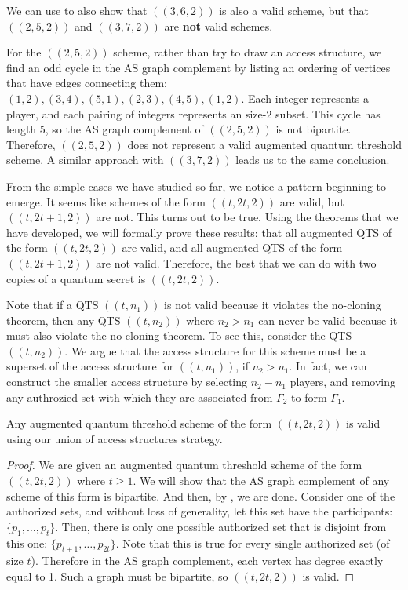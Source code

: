 We can use  to also show that $((3,6,2))$ is also a valid scheme, but that $((2,5,2))$ and $((3,7,2))$ are \textbf{not} valid schemes.

For the $((2,5,2))$ scheme, rather than try to draw an access structure, we find an odd cycle in the AS graph complement by listing an ordering of vertices that have edges connecting them: $(1,2), (3,4), (5,1), (2,3), (4,5), (1,2)$. Each integer represents a player, and each pairing of integers represents an size-2 subset. This cycle has length 5, so the AS graph complement of $((2,5,2))$ is not bipartite. Therefore, $((2,5,2))$ does not represent a valid augmented quantum threshold scheme. A similar approach with $((3,7,2))$ leads us to the same conclusion.

From the simple cases we have studied so far, we notice a pattern beginning to emerge. It seems like schemes of the form $((t,2t,2))$ are valid, but $((t,2t+1,2))$ are not. This turns out to be true. Using the theorems that we have developed, we will formally prove these results: that all augmented QTS of the form $((t,2t,2))$ are valid, and all augmented QTS of the form $((t, 2t+1, 2))$ are not valid. Therefore, the best that we can do with two copies of a quantum secret is $((t,2t,2))$. 

\begin{remark}
    Note that if a QTS $((t,n_1))$ is not valid because it violates the no-cloning theorem, then any QTS $((t,n_2))$ where $n_2 > n_1$ can never be valid because it must also violate the no-cloning theorem. To see this, consider the QTS $((t,n_2))$. We argue that the access structure for this scheme must be a superset of the access structure for $((t,n_1))$, if $n_2 > n_1$. In fact, we can construct the smaller access structure by selecting $n_2-n_1$ players, and removing any authrozied set with which they are associated from $\Gamma_2$ to form $\Gamma_1$.
\end{remark}

\begin{theorem}
    \label{thm:t-2t-2}
    Any augmented quantum threshold scheme of the form $((t,2t,2))$ is valid using our union of access structures strategy.
\end{theorem}

\begin{proof}
    We are given an augmented quantum threshold scheme of the form $((t,2t,2))$ where $t \geq 1$. We will show that the AS graph complement of any scheme of this form is bipartite. And then, by , we are done. Consider one of the authorized sets, and without loss of generality, let this set have the participants: $\{p_1,\dots,p_t\}$. Then, there is only one possible authorized set that is disjoint from this one: $\{p_{t+1},\dots,p_{2t}\}$. Note that this is true for every single authorized set (of size $t$). Therefore in the AS graph complement, each vertex has degree exactly equal to 1. Such a graph must be bipartite, so $((t,2t,2))$ is valid.
\end{proof}

